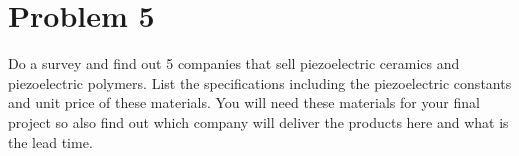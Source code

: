 \documentclass[../main.tex]{subfiles}
\begin{document}
\section{Problem 5}

Do a survey and find out 5 companies that sell piezoelectric ceramics and piezoelectric polymers. 
List the specifications including the piezoelectric constants and unit price of these materials. 
You will need these materials for your final project so also find out which company will deliver the products here and what is the lead time.
\end{document}
